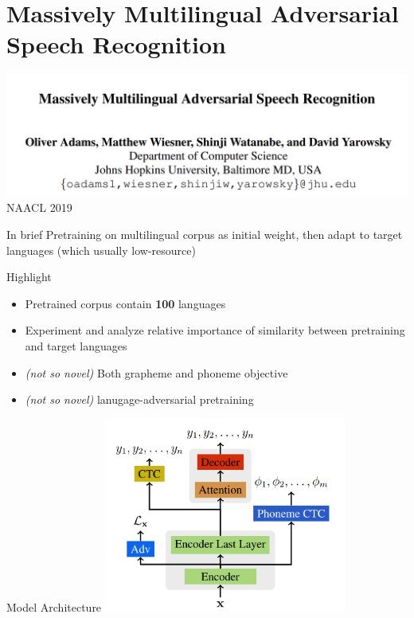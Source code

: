 \documentclass{beamer}
\begin{document}
\section{Massively Multilingual Adversarial Speech Recognition}
\begin{frame}
  \includegraphics[width=\textwidth]{fig/p2-title.png}
  \center NAACL 2019
\end{frame}

\begin{frame}{In brief}
  Pretraining on multilingual corpus as initial weight, then adapt to target languages (which usually low-resource)
\end{frame}

\begin{frame}{Highlight}
  \begin{itemize}
    \item Pretrained corpus contain \textbf{100} languages
    \item Experiment and analyze relative importance of similarity between pretraining and target languages
    \item \textit{(not so novel)} Both grapheme and phoneme objective
    \item \textit{(not so novel)} lanugage-adversarial pretraining
  \end{itemize}
\end{frame}

\begin{frame}{Model Architecture}
  \center \includegraphics[width=0.6\textwidth]{fig/p2-arch.png}
\end{frame}
\end{document}
